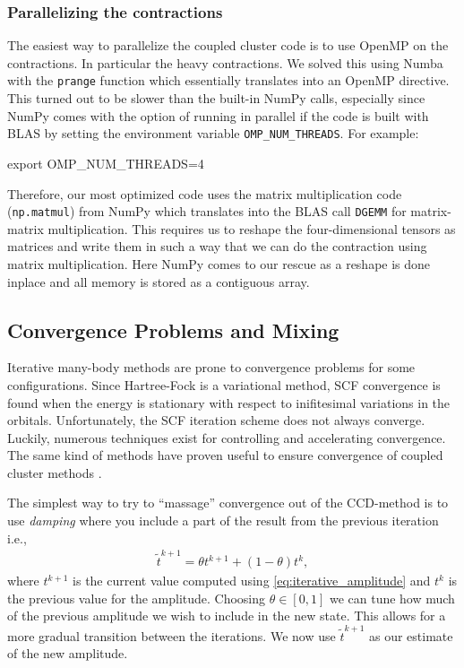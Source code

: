 \documentclass[
    a4paper, aps, twocolumn, floatfix, superscriptaddress,
    nofootinbib]{revtex4-1}
\newcommand{\1}{\mathds{1}}
\begin{document}
        \subsubsection{Parallelizing the contractions}
            The easiest way to parallelize the coupled cluster code is to use
            OpenMP on the contractions. In particular the heavy contractions. We
            solved this using Numba with the \texttt{prange} function which
            essentially translates into an OpenMP directive. This turned out to
            be slower than the built-in NumPy calls, especially since NumPy
            comes with the option of running in parallel if the code is built
            with BLAS by setting the environment variable
            \texttt{OMP\_NUM\_THREADS}. For example:
            \begin{bash}
                export OMP_NUM_THREADS=4
            \end{bash}

            Therefore, our most optimized code uses the matrix multiplication
            code (\texttt{np.matmul}) from NumPy which translates into the BLAS
            call \texttt{DGEMM} for matrix-matrix multiplication. This requires
            us to reshape the four-dimensional tensors as matrices and write
            them in such a way that we can do the contraction using matrix
            multiplication. Here NumPy comes to our rescue as a reshape is done
            inplace and all memory is stored as a contiguous array.

    \subsection{Convergence Problems and Mixing}

        Iterative many-body methods are prone to convergence problems for some
        configurations. Since Hartree-Fock is a variational method, SCF convergence
        is found when the energy is stationary with respect to inifitesimal
        variations in the orbitals. Unfortunately, the SCF iteration scheme does
        not always converge. Luckily, numerous techniques exist for controlling
        and accelerating convergence\cite{schlegel1991you}. The same kind of
        methods have proven useful to ensure convergence of coupled cluster methods
        \cite{scuseria1986accelerating}.

        The simplest way to try to ``massage'' convergence out of the CCD-method
        is to use \emph{damping} where you include a part of the result from the
        previous iteration i.e.,
        \begin{align}
            \tilde{t}^{k + 1} = \theta t^{k + 1} + (1 - \theta)t^k,
            \label{eq:mixing}
        \end{align}
        where $t^{k + 1}$ is the current value computed using
        \autoref{eq:iterative_amplitude} and $t^k$ is the previous value for the
        amplitude. Choosing $\theta \in [0, 1]$ we can tune how much of the
        previous amplitude we wish to include in the new state. This allows for
        a more gradual transition between the iterations. We now use
        $\tilde{t}^{k + 1}$ as our estimate of the new amplitude.
\end{document}
